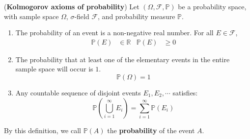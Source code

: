 \documentclass{huhtakm-template-book}
\newcommand{\prob}{\mathbb{P}}
\begin{document}
\begin{defn}(\textbf{Kolmogorov axioms of probability})
	Let $(\Omega,\mathcal{F},\prob)$ be a probability space, with sample space $\Omega$, $\sigma$-field $\mathcal{F}$, and probability measure $\prob$.
	\begin{enumerate}
		\item The probability of an event is a non-negative real number. For all $E\in\mathcal{F}$,
		\begin{align*}
			\prob(E)&\in\mathbb{R} & \prob(E)&\geq 0
		\end{align*}
		\item The probability that at least one of the elementary events in the entire sample space will occur is $1$.
		\begin{equation*}
			\prob(\Omega)=1
		\end{equation*}
		\item Any countable sequence of disjoint events $E_{1},E_{2},\cdots$ satisfies:
		\begin{equation*}
			\prob\left(\bigcup_{i=1}^{\infty}E_{i}\right)=\sum_{i=1}^{\infty}\prob(E_{i})
		\end{equation*}
	\end{enumerate}
	By this definition, we call $\prob(A)$ the \textbf{probability} of the event $A$.
\end{defn}
\end{document}
